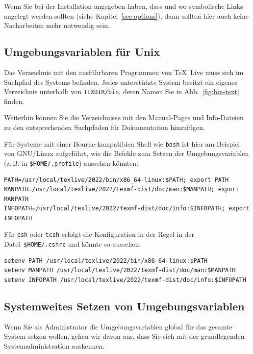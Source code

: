 \documentclass[12pt,ngerman,a4paper,fullparskip]{report}
\newcommand{\TL}{\TeX\ Live\xspace}
\newcommand{\prog}[1]{\texttt{#1}}
\newcommand{\filename}[1]{\texttt{#1}}
\newcommand{\dirname}[1]{\texttt{#1}}
\begin{document}
Wenn Sie bei der Installation angegeben haben, dass und wo symbolische Links angelegt werden sollten (siehe Kapitel~\ref{sec:options}), dann sollten hier auch keine Nacharbeiten mehr notwendig sein.

\subsection{Umgebungsvariablen für Unix}
\label{sec:env}

Das Verzeichnis mit den ausführbaren Programmen von \TL muss sich im Suchpfad des Systems befinden.
Jedes unterstützte System besitzt ein eigenes Verzeichnis unterhalb von \dirname{TEXDIR/bin}, deren
Namen Sie in Abb.~\ref{fig:bin-text} finden.

Weiterhin können Sie die Verzeichnisse mit den Manual-Pages und Info-Dateien zu den entsprechenden
Suchpfaden für Dokumentation hinzufügen.

Für Systeme mit einer Bourne-kompatiblen Shell wie \prog{bash} ist hier am Beispiel von GNU/Linux
aufgeführt, wie die Befehle zum Setzen der Umgebungsvariablen (z.\,B. in \filename{\$HOME/.profile})
aussehen könnten:

\begin{verbatim}
PATH=/usr/local/texlive/2022/bin/x86_64-linux:$PATH; export PATH
MANPATH=/usr/local/texlive/2022/texmf-dist/doc/man:$MANPATH; export MANPATH
INFOPATH=/usr/local/texlive/2022/texmf-dist/doc/info:$INFOPATH; export INFOPATH
\end{verbatim}


\noindent Für \prog{csh} oder \prog{tcsh} erfolgt die Konfiguration in der Regel in der Datei~\filename{\$HOME/.cshrc}
und könnte so aussehen:

\begin{verbatim}
setenv PATH /usr/local/texlive/2022/bin/x86_64-linux:$PATH
setenv MANPATH /usr/local/texlive/2022/texmf-dist/doc/man:$MANPATH
setenv INFOPATH /usr/local/texlive/2022/texmf-dist/doc/info:$INFOPATH
\end{verbatim}

\subsection{Systemweites Setzen von Umgebungsvariablen}
\label{sec:envglobal}


Wenn Sie als Administrator die Umgebungsvariablen global für das gesamte System setzen wollen,
gehen wir davon aus, dass Sie sich mit der grundlegenden Systemadministration auskennen.
\end{document}
